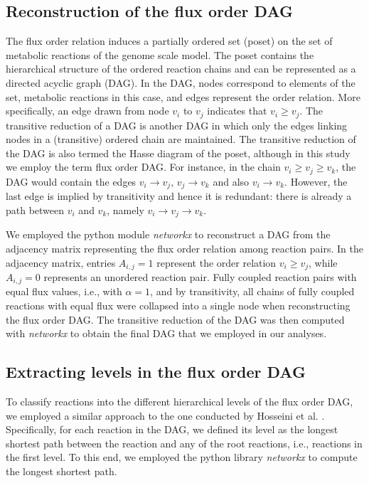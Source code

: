 \documentclass[12pt]{article}
\begin{document}
\subsection{Reconstruction of the flux order DAG}
\label{sec:fluxorderDAG}
The flux order relation induces a partially ordered set (poset) on the set of metabolic reactions of the genome scale model. The poset contains the hierarchical structure of the ordered reaction chains and can be represented as a directed acyclic graph (DAG). In the DAG, nodes correspond to elements of the set, metabolic reactions in this case, and edges represent the order relation. More specifically, an edge drawn from node $v_i$ to $v_j$ indicates that $v_i \geq v_j$. The transitive reduction of a DAG is another DAG in which only the edges linking nodes in a (transitive) ordered chain are maintained. The transitive reduction of the DAG is also termed the Hasse diagram of the poset, although in this study we employ the term flux order DAG. For instance, in the chain $v_i \geq v_j \geq v_k$, the DAG would contain the edges $v_i \rightarrow v_j$, $v_j \rightarrow v_k$ and also $v_i \rightarrow v_k$. However, the last edge is implied by transitivity and hence it is redundant: there is already a path between $v_i$ and $v_k$, namely $v_i \rightarrow v_j \rightarrow v_k$.

We employed the python module \emph{networkx} \cite{Hagberg2008} to reconstruct a DAG from the adjacency matrix representing the flux order relation among reaction pairs. In the adjacency matrix, entries $A_{i,j} = 1$ represent the order relation $v_i \geq v_j$, while $A_{i,j} = 0$ represents an unordered reaction pair. Fully coupled reaction pairs with equal flux values, i.e., with $\alpha = 1$, and by transitivity, all chains of fully coupled reactions with equal flux were collapsed into a single node when reconstructing the flux order DAG. The transitive reduction of the DAG was then computed with \emph{networkx} to obtain the final DAG that we employed in our analyses.

\subsection{Extracting levels in the flux order DAG}
\label{subsection:DAGlevels}
To classify reactions into the different hierarchical levels of the flux order DAG, we employed a similar approach to the one conducted by Hosseini et al. \cite{Hosseini2015}. Specifically, for each reaction in the DAG, we defined its level as the longest shortest path between the reaction and any of the root reactions, i.e., reactions in the first level. To this end, we employed the python library \emph{networkx} \cite{Hagberg2008} to compute the longest shortest path.
\end{document}
